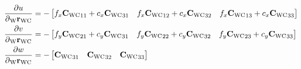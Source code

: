 \begin{align}
  \dfrac{\partial{u}}{\partial{\camPos}} &=
    -\begin{bmatrix}
      f_{x} \camRot_{11} + c_{x} \camRot_{31} &
      f_{x} \camRot_{12} + c_{x} \camRot_{32} &
      f_{x} \camRot_{13} + c_{x} \camRot_{33}
    \end{bmatrix} \\
  \dfrac{\partial{v}}{\partial{\camPos}} &=
    -\begin{bmatrix}
      f_{y} \camRot_{21} + c_{y} \camRot_{31} &
      f_{y} \camRot_{22} + c_{y} \camRot_{32} &
      f_{y} \camRot_{23} + c_{y} \camRot_{33}
    \end{bmatrix} \\
  \dfrac{\partial{w}}{\partial{\camPos}} &=
    -\begin{bmatrix}
      \camRot_{31} &
      \camRot_{32} &
      \camRot_{33}
    \end{bmatrix}
\end{align}



